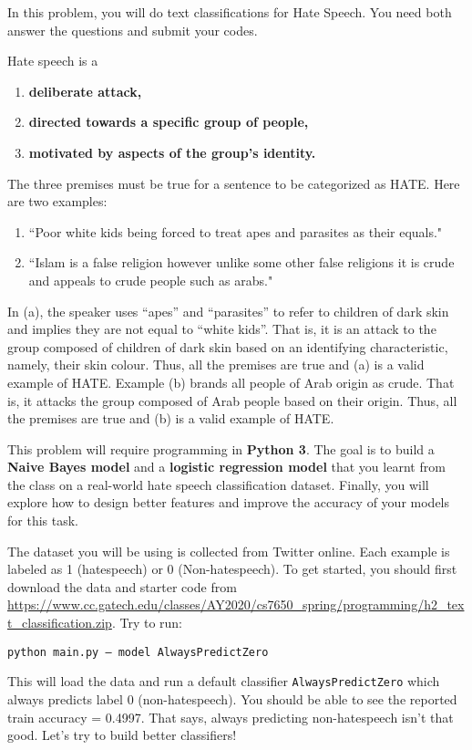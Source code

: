 In this problem, you will do text classifications for Hate Speech. You need both answer the questions and submit your codes. 

Hate speech is a 
\begin{enumerate}
    \item \textbf{deliberate attack,}
    \item \textbf{directed towards a specific group of people, }
    \item \textbf{motivated by aspects of the group’s identity.}
\end{enumerate}
The three premises must be true for a sentence to
be categorized as HATE. Here are two examples:
\begin{enumerate}
    \item ``Poor white kids being forced to treat apes
and parasites as their equals."
  \item ``Islam is a false religion however unlike
some other false religions it is crude and
appeals to crude people such as arabs."
\end{enumerate}
In (a), the speaker uses “apes” and “parasites” to
refer to children of dark skin and implies they are
not equal to “white kids”. That is, it is an attack to
the group composed of children of dark skin based
on an identifying characteristic, namely, their skin
colour. Thus, all the premises are true and (a) is
a valid example of HATE. Example (b) brands all
people of Arab origin as crude. That is, it attacks
the group composed of Arab people based on their
origin. Thus, all the premises are true and (b) is a
valid example of HATE. 

This problem will require programming in \textbf{Python 3}. The goal is to build a \textbf{Naive Bayes model} and a \textbf{logistic
regression model} that you learnt from the class on a real-world hate speech classification dataset. Finally, you
will explore how to design better features and improve the accuracy of your models for this task.

The dataset you will be using is collected from Twitter online. Each example is labeled as 1 (hatespeech) or 0 (Non-hatespeech).
To get started, you should first download the data and starter code from \url{https://www.cc.gatech.edu/classes/AY2020/cs7650_spring/programming/h2_text_classification.zip}. Try to run:

\texttt{python main.py -- model AlwaysPredictZero}

This will load the data and run a default classifier \texttt{AlwaysPredictZero} which always predicts label 0 (non-hatespeech). You should be able to see the reported train accuracy = 0.4997. That says, always predicting non-hatespeech isn’t that good. Let’s try to build better classifiers!

